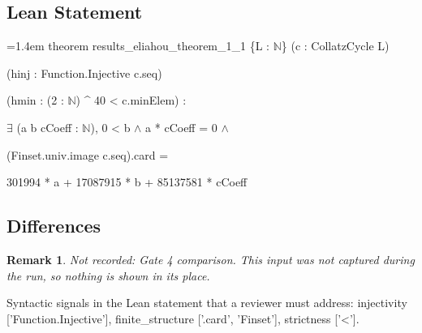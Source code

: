 \documentclass[11pt]{article}
\newtheorem{remark}[theorem]{Remark}
\begin{document}
\subsection*{Lean Statement}
{\footnotesize\ttfamily\raggedright\hangindent=1.4em\noindent
\hspace*{0.00em}theorem results\_\allowbreak{}eliahou\_\allowbreak{}theorem\_\allowbreak{}1\_\allowbreak{}1 \{L : \ensuremath{\mathbb{N}}\} (c : CollatzCycle L)\par
\hspace*{2.20em}(hinj : Function.\allowbreak{}Injective c.\allowbreak{}seq)\par
\hspace*{2.20em}(hmin : (2 : \ensuremath{\mathbb{N}}) \textasciicircum{} 40 < c.\allowbreak{}minElem) :\par
\hspace*{2.20em}\ensuremath{\exists} (a b cCoeff : \ensuremath{\mathbb{N}}), 0 < b \ensuremath{\wedge} a * cCoeff = 0 \ensuremath{\wedge}\par
\hspace*{3.30em}(Finset.\allowbreak{}univ.\allowbreak{}image c.\allowbreak{}seq).\allowbreak{}card =\par
\hspace*{4.40em}301994 * a + 17087915 * b + 85137581 * cCoeff\par
}

\subsection*{Differences}
\begin{remark}\textit{Not recorded: Gate 4 comparison.} This input was not captured during the run, so nothing is shown in its place.\end{remark}
Syntactic signals in the Lean statement that a reviewer must address: injectivity ['Function.Injective'], finite\_structure ['.card', 'Finset'], strictness ['<'].
\end{document}
